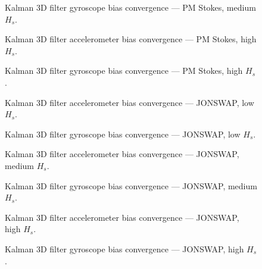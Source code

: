 \documentclass[11pt,letterpaper]{article}
\begin{document}
\begin{figure}[H]\centering
  \resizebox{\textwidth}{!}{}
  \caption{Kalman 3D filter gyroscope bias convergence — PM Stokes, medium $H_s$.}
  \label{fig:w3d_pmstokes_medium_gyro_bias}
\end{figure}

\begin{figure}[H]\centering
  \resizebox{\textwidth}{!}{}
  \caption{Kalman 3D filter accelerometer bias convergence — PM Stokes, high $H_s$.}
  \label{fig:w3d_pmstokes_high_acc_bias}
\end{figure}

\begin{figure}[H]\centering
  \resizebox{\textwidth}{!}{}
  \caption{Kalman 3D filter gyroscope bias convergence — PM Stokes, high $H_s$.}
  \label{fig:w3d_pmstokes_high_gyro_bias}
\end{figure}

\begin{figure}[H]\centering
  \resizebox{\textwidth}{!}{}
  \caption{Kalman 3D filter accelerometer bias convergence — JONSWAP, low $H_s$.}
  \label{fig:w3d_jonswap_low_acc_bias}
\end{figure}

\begin{figure}[H]\centering
  \resizebox{\textwidth}{!}{}
  \caption{Kalman 3D filter gyroscope bias convergence — JONSWAP, low $H_s$.}
  \label{fig:w3d_jonswap_low_gyro_bias}
\end{figure}

\begin{figure}[H]\centering
  \resizebox{\textwidth}{!}{}
  \caption{Kalman 3D filter accelerometer bias convergence — JONSWAP, medium $H_s$.}
  \label{fig:w3d_jonswap_medium_acc_bias}
\end{figure}

\begin{figure}[H]\centering
  \resizebox{\textwidth}{!}{}
  \caption{Kalman 3D filter gyroscope bias convergence — JONSWAP, medium $H_s$.}
  \label{fig:w3d_jonswap_medium_gyro_bias}
\end{figure}

\begin{figure}[H]\centering
  \resizebox{\textwidth}{!}{}
  \caption{Kalman 3D filter accelerometer bias convergence — JONSWAP, high $H_s$.}
  \label{fig:w3d_jonswap_high_acc_bias}
\end{figure}

\begin{figure}[H]\centering
  \resizebox{\textwidth}{!}{}
  \caption{Kalman 3D filter gyroscope bias convergence — JONSWAP, high $H_s$.}
  \label{fig:w3d_jonswap_high_gyro_bias}
\end{figure}
\end{document}
